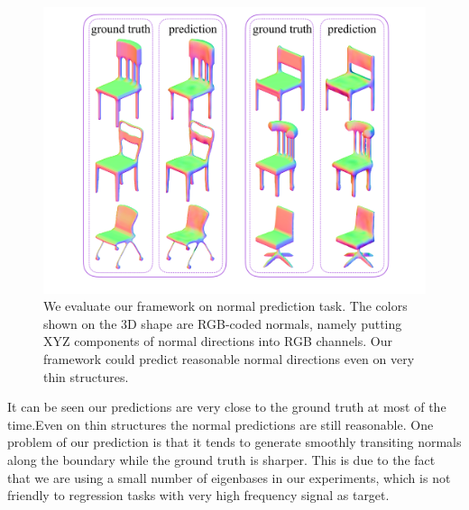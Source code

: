 \begin{figure}
 \centering
 \includegraphics[width=1\linewidth]{./fig/visnormal.pdf}
 \caption{We evaluate our framework on normal prediction task. The colors shown on the 3D shape are RGB-coded normals, namely putting XYZ components of normal directions into RGB channels. Our framework could predict reasonable normal directions even on very thin structures.}
 \label{fig:normpred}
\end{figure}

It can be seen our predictions are very close to the ground truth at most of the time.Even on thin structures the normal predictions are still reasonable. One problem of our prediction is that it tends to generate smoothly transiting normals along the boundary while the ground truth is sharper. This is due to the fact that we are using a small number of eigenbases in our experiments, which is not friendly to regression tasks with very high frequency signal as target.